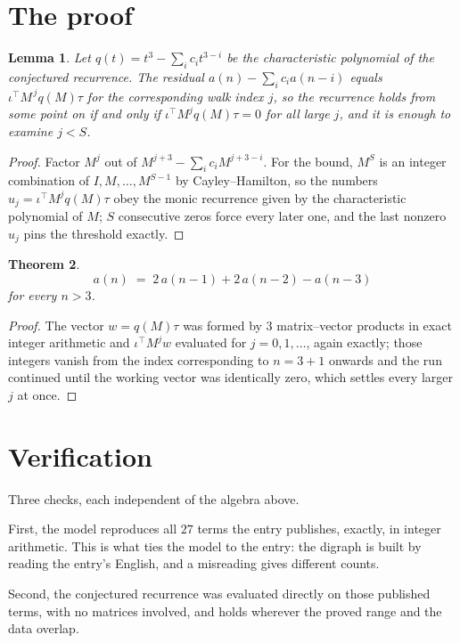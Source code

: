 \documentclass[11pt,a4paper]{article}
\theoremstyle{plain}
\newtheorem{theorem}{Theorem}
\newtheorem{lemma}[theorem]{Lemma}
\theoremstyle{definition}
\begin{document}
\section{The proof}

\begin{lemma}\label{lem:crit}
Let $q(t)=t^{3}-\sum_i c_it^{3-i}$ be the characteristic polynomial of the
conjectured recurrence. The residual $a(n)-\sum_ic_ia(n-i)$ equals
$\iota^{\!\top}M^{\,j}q(M)\tau$ for the corresponding walk index $j$, so the recurrence
holds from some point on if and only if $\iota^{\!\top}M^{j}q(M)\tau=0$ for all large $j$,
and it is enough to examine $j<S$.
\end{lemma}

\begin{proof}
Factor $M^{j}$ out of $M^{j+3}-\sum_ic_iM^{j+3-i}$. For the bound, $M^{S}$
is an integer combination of $I,M,\dots,M^{S-1}$ by Cayley--Hamilton, so the numbers
$u_j=\iota^{\!\top}M^{j}q(M)\tau$ obey the monic recurrence given by the characteristic
polynomial of $M$; $S$ consecutive zeros force every later one, and the last nonzero $u_j$
pins the threshold exactly.
\end{proof}

\begin{theorem}
\[
a(n)\;=\;2\,a(n-1) + 2\,a(n-2) - a(n-3)
\]
for every $n>3$.
\end{theorem}

\begin{proof}
The vector $w=q(M)\tau$ was formed by $3$ matrix--vector products in exact integer
arithmetic and $\iota^{\!\top}M^{j}w$ evaluated for $j=0,1,\dots$, again exactly; those
integers vanish from the index corresponding to $n=3+1$ onwards and the run continued
until the working vector was identically zero, which settles every larger $j$ at once.
\end{proof}

\section{Verification}

Three checks, each independent of the algebra above.

First, the model reproduces all $27$ terms the entry publishes, exactly, in integer
arithmetic. This is what ties the model to the entry: the digraph is built by reading the
entry's English, and a misreading gives different counts.

Second, the conjectured recurrence was evaluated directly on those published terms, with no
matrices involved, and holds wherever the proved range and the data overlap.
\end{document}
